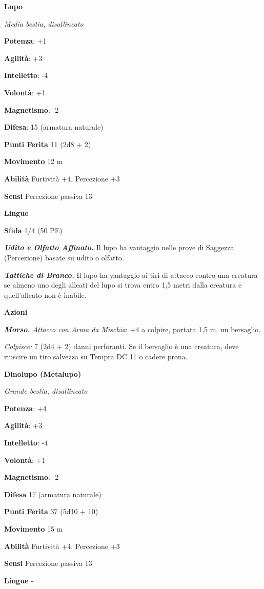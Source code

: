 \begin{multicols}{2}
\textbf{Lupo}

\emph{Media bestia, disallineato}

\textbf{Potenza}: +1

\textbf{Agilità}: +3

\textbf{Intelletto}: -4

\textbf{Volontà}: +1

\textbf{Magnetismo}: -2

\textbf{Difesa}: 15 (armatura naturale)

\textbf{Punti Ferita} 11 (2d8 + 2)

\textbf{Movimento} 12 m

\textbf{Abilità} Furtività +4, Percezione +3

\textbf{Sensi} Percezione passiva 13

\textbf{Lingue} -

\textbf{Sfida} 1/4 (50 PE)

\emph{\textbf{Udito e Olfatto Affinato.}} Il lupo ha vantaggio nelle
prove di Saggezza (Percezione) basate su udito o olfatto.

\emph{\textbf{Tattiche di Branco.}} Il lupo ha vantaggio ai tiri di
attacco contro una creatura se almeno uno degli alleati del lupo si
trova entro 1,5 metri dalla creatura e quell'alleato non è inabile.

\textbf{Azioni}

\emph{\textbf{Morso.} Attacco con Arma da Mischia}: +4 a colpire,
portata 1,5 m, un bersaglio.

\emph{Colpisce:} 7 (2d4 + 2) danni perforanti. Se il bersaglio è una
creatura, deve riuscire un tiro salvezza su Tempra DC 11 o cadere prona.

\textbf{Dinolupo (Metalupo)}

\emph{Grande bestia, disallineato}

\textbf{Potenza}: +4

\textbf{Agilità}: +3

\textbf{Intelletto}: -4

\textbf{Volontà}: +1

\textbf{Magnetismo}: -2

\textbf{Difesa} 17 (armatura naturale)

\textbf{Punti Ferita} 37 (5d10 + 10)

\textbf{Movimento} 15 m

\textbf{Abilità} Furtività +4, Percezione +3

\textbf{Sensi} Percezione passiva 13

\textbf{Lingue} -


\end{multicols}
